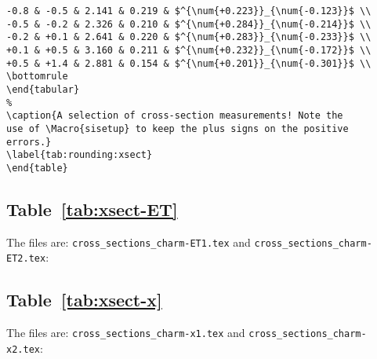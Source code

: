 \documentclass[UKenglish,texlive=2016]{\ATLASLATEXPATH atlasdoc}
\begin{document}
\begin{verbatim}
-0.8 & -0.5 & 2.141 & 0.219 & $^{\num{+0.223}}_{\num{-0.123}}$ \\
-0.5 & -0.2 & 2.326 & 0.210 & $^{\num{+0.284}}_{\num{-0.214}}$ \\
-0.2 & +0.1 & 2.641 & 0.220 & $^{\num{+0.283}}_{\num{-0.233}}$ \\
+0.1 & +0.5 & 3.160 & 0.211 & $^{\num{+0.232}}_{\num{-0.172}}$ \\
+0.5 & +1.4 & 2.881 & 0.154 & $^{\num{+0.201}}_{\num{-0.301}}$ \\
\bottomrule
\end{tabular}
%
\caption{A selection of cross-section measurements! Note the
use of \Macro{sisetup} to keep the plus signs on the positive
errors.}
\label{tab:rounding:xsect}
\end{table}
\end{verbatim}

\subsection{Table~\protect\ref{tab:xsect-ET}}
The files are: \texttt{cross\_sections\_charm-ET1.tex} and 
\texttt{cross\_sections\_charm-ET2.tex}:
{\scriptsize
  
}
{\scriptsize
  
}

\subsection{Table~\protect\ref{tab:xsect-x}}

The files are: \texttt{cross\_sections\_charm-x1.tex} and 
\texttt{cross\_sections\_charm-x2.tex}:
{\scriptsize
  
}
{\tiny
  
}
\end{document}
